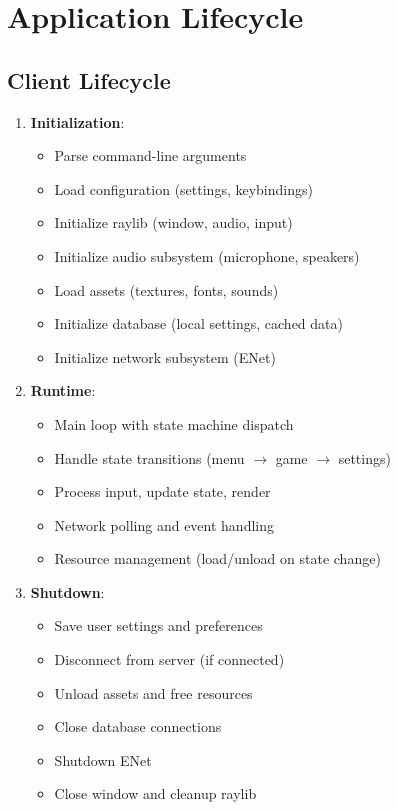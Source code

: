 \documentclass[11pt]{article}
\begin{document}
\section{Application Lifecycle}

\subsection{Client Lifecycle}

\begin{enumerate}
  \item \textbf{Initialization}:
    \begin{itemize}
      \item Parse command-line arguments
      \item Load configuration (settings, keybindings)
      \item Initialize raylib (window, audio, input)
      \item Initialize audio subsystem (microphone, speakers)
      \item Load assets (textures, fonts, sounds)
      \item Initialize database (local settings, cached data)
      \item Initialize network subsystem (ENet)
    \end{itemize}
  \item \textbf{Runtime}:
    \begin{itemize}
      \item Main loop with state machine dispatch
      \item Handle state transitions (menu $\rightarrow$ game $\rightarrow$ settings)
      \item Process input, update state, render
      \item Network polling and event handling
      \item Resource management (load/unload on state change)
    \end{itemize}
  \item \textbf{Shutdown}:
    \begin{itemize}
      \item Save user settings and preferences
      \item Disconnect from server (if connected)
      \item Unload assets and free resources
      \item Close database connections
      \item Shutdown ENet
      \item Close window and cleanup raylib
    \end{itemize}
\end{enumerate}
\end{document}
